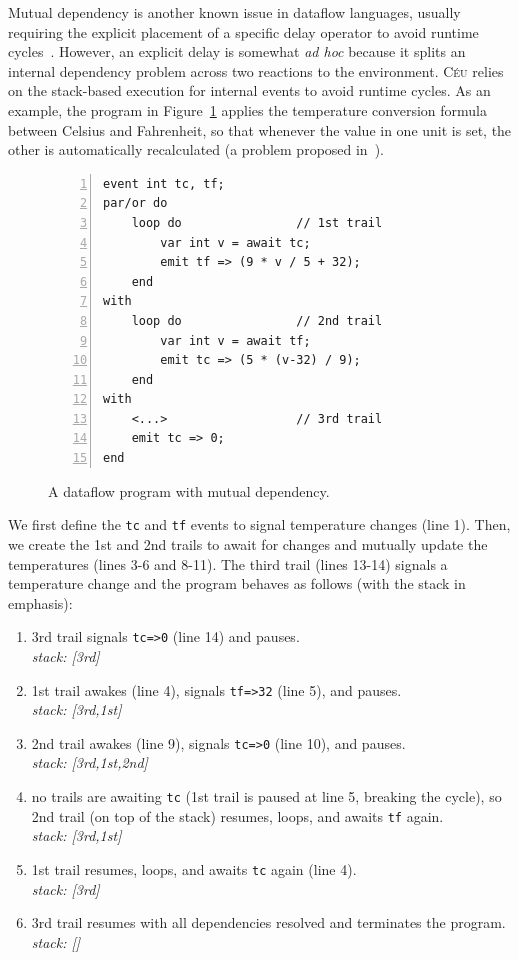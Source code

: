 \documentclass{acm_proc_article-sp}
\newcommand{\CEU}{\textsc{C\'{e}u}\xspace}
\newcommand{\code}[1] {{\small{\texttt{#1}}}}
\newcommand{\1}{\;}
\newcommand{\2}{\;\;}
\newcommand{\3}{\;\;\;}
\newcommand{\5}{\;\;\;\;\;}
\begin{document}
Mutual dependency is another known issue in dataflow languages, usually 
requiring the explicit placement of a specific delay operator to avoid runtime
cycles~\cite{frtime.embedding,luagravity.sblp}.
%
However, an explicit delay is somewhat \emph{ad hoc} because it splits an 
internal dependency problem across two reactions to the environment.
%
\CEU relies on the stack-based execution for internal events to avoid runtime 
cycles.
%
As an example, the program in Figure~\ref{lst.frp2} applies the temperature 
conversion formula between Celsius and Fahrenheit, so that whenever the value 
in one unit is set, the other is automatically recalculated (a problem proposed 
in~\cite{frp.survey}).
%
\begin{figure}[t]
\begin{lstlisting}[numbers=left,xleftmargin=2em]
event int tc, tf;
par/or do
    loop do                // 1st trail
        var int v = await tc;
        emit tf => (9 * v / 5 + 32);
    end
with
    loop do                // 2nd trail
        var int v = await tf;
        emit tc => (5 * (v-32) / 9);
    end
with
    <...>                  // 3rd trail
    emit tc => 0;
end
\end{lstlisting}
\caption{ A dataflow program with mutual dependency.
\label{lst.frp2}
}
\end{figure}
%
We first define the \code{tc} and \code{tf} events to signal temperature 
changes (line 1).
Then, we create the 1st and 2nd trails to await for changes and mutually update 
the temperatures (lines 3-6 and 8-11).
The third trail (lines 13-14) signals a temperature change and the program 
behaves as follows (with the stack in emphasis):
%
{\small
\begin{enumerate}
\setlength{\itemsep}{0pt}
\item 3rd trail signals \code{tc=>0} (line 14) and pauses.\\
    \emph{stack: [3rd]}
\item 1st trail awakes (line 4), signals \code{tf=>32} (line 5), and pauses.\\
    \emph{stack: [3rd,1st]}
\item 2nd trail awakes (line 9), signals \code{tc=>0} (line 10), and pauses.\\
    \emph{stack: [3rd,1st,2nd]}
\item no trails are awaiting \code{tc} (1st trail is paused at line 5, breaking 
    the cycle), so 2nd trail (on top of the stack) resumes, loops, and awaits 
\code{tf} again.\\
    \emph{stack: [3rd,1st]}
\item 1st trail resumes, loops, and awaits \code{tc} again (line 4).\\
    \emph{stack: [3rd]}
\item 3rd trail resumes with all dependencies resolved and terminates the 
    program.\\
    \emph{stack: []}
\end{enumerate}
}
\end{document}
